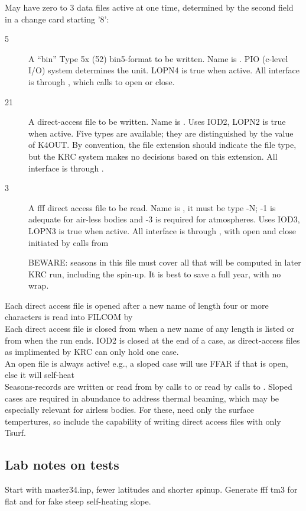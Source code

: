 May have zero to 3 data files active at one time, determined by the second field in a change card starting '8':
\begin{description}  %
\item [ 5] A ``bin'' Type 5x (52) bin5-format to be written. Name is .
  PIO (c-level I/O) system determines the unit.  LOPN4 is true when active. All interface is through , which calls  to open or close.

\item [21] A direct-access file to be written. Name is .  Uses IOD2,
  LOPN2 is true when active. Five types are available; they are distinguished by
  the value of K4OUT. By convention, the file extension should indicate the file
  type, but the KRC system makes no decisions based on this extension.  All interface is through .
\item [ 3] A fff direct access file to be read. Name is
  , it must be type -N; -1 is adequate for air-less bodies and -3 is
  required for atmospheres. Uses IOD3, LOPN3 is true when active.  All interface is through , with open and close initiated by calls from   

BEWARE: seasons in this file must cover all that will be computed in later KRC
run, including the spin-up. It is best to save a full year, with no wrap.

 \end{description}
Each  direct access file is opened after a new name of length four or more characters is read into FILCOM by 
\\ Each  direct access file is closed from  when a new name of any length is listed or from  when the run ends.
\qii IOD2 is closed at the end of a case, as direct-access files as implimented by KRC can only hold one case.
\\ An open file is always active!
\qi e.g., a sloped case will use FFAR if that is open, else it will self-heat
\\ Seasons-records are written or read from  by calls to  or read by calls to .  
 Sloped cases are required in abundance to address thermal beaming, which may be
 especially relevant for airless bodies. For these, need only the surface
 tempertures, so include the capability of writing direct access files with only Tsurf.

\subsection{Lab notes on tests}
Start with master34.inp, fewer latitudes and shorter spinup. Generate fff tm3 for flat and for fake steep self-heating slope.

